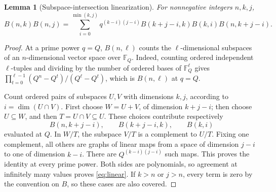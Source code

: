 \documentclass[11pt]{article}
\newtheorem{lemma}[theorem]{Lemma}
\begin{document}
\begin{lemma}[Subspace-intersection linearization]\label{lem:linear}
For nonnegative integers \(n,k,j\),
\begin{equation}\label{eq:linear}
B(n,k)B(n,j)=
\sum_{i=0}^{\min(k,j)}
q^{(k-i)(j-i)}
B(k+j-i,k)B(k,i)B(n,k+j-i).
\end{equation}
\end{lemma}
\begin{proof}
At a prime power \(q=Q\), \(B(n,\ell)\) counts the \(\ell\)-dimensional
subspaces of an \(n\)-dimensional vector space over \(\mathbb F_Q\).
Indeed, counting ordered independent \(\ell\)-tuples and dividing by
the number of ordered bases of \(\mathbb F_Q^\ell\) gives
\(\prod_{t=0}^{\ell-1}(Q^n-Q^t)/(Q^\ell-Q^t)\), which is \(B(n,\ell)\)
at \(q=Q\).

Count ordered pairs of subspaces \(U,V\) with dimensions \(k,j\),
according to \(i=\dim(U\cap V)\).
First choose \(W=U+V\), of dimension \(k+j-i\); then choose
\(U\subseteq W\), and then \(T=U\cap V\subseteq U\).
These choices contribute respectively
\[
B(n,k+j-i),\qquad B(k+j-i,k),\qquad B(k,i)
\]
evaluated at \(Q\).
In \(W/T\), the subspace \(V/T\) is a complement to \(U/T\).
Fixing one complement, all others are graphs of linear maps from
a space of dimension \(j-i\) to one of dimension \(k-i\).
There are \(Q^{(k-i)(j-i)}\) such maps.
This proves the identity at every prime power.
Both sides are polynomials, so agreement at infinitely many values
proves \eqref{eq:linear}. If \(k>n\) or \(j>n\), every term is zero
by the convention on \(B\), so these cases are also covered.
\end{proof}
\end{document}
